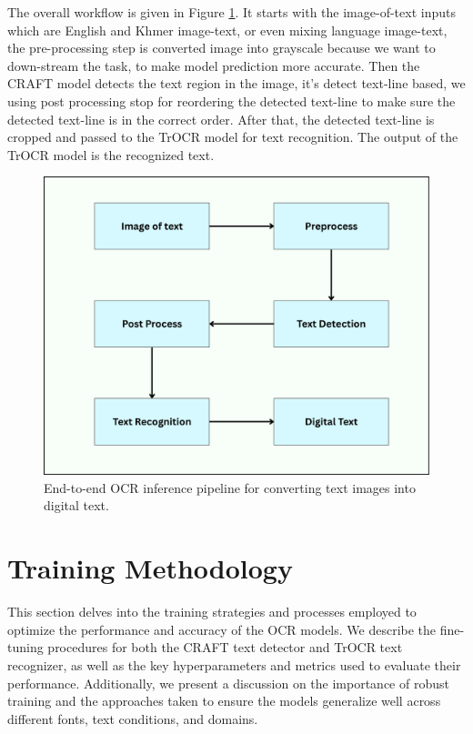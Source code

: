 The overall workflow is given in Figure \ref{fig:trocr-inference-full-pipeline}.
It starts with the image-of-text inputs which are English and
Khmer image-text, or even mixing language image-text, the pre-processing
step is converted image into grayscale because we want to down-stream
the task, to make model prediction more accurate. Then the CRAFT model
detects the text region in the image, it's detect text-line based,
we using post processing stop for reordering the detected text-line
to make sure the detected text-line is in the correct order.
After that, the detected text-line is cropped and passed to the TrOCR
model for text recognition. The output of the TrOCR model is the
recognized text. 
\begin{figure}[H]
    \centering
    \includegraphics[width=\textwidth]{figures/khmerOCR_inference_full_pipeline.png}
    \caption{End-to-end OCR inference pipeline for converting text images into digital text.}
    \label{fig:trocr-inference-full-pipeline}
\end{figure}

\section{Training Methodology}
\label{sec:training}
This section delves into the training strategies and processes employed to optimize 
the performance and accuracy of the OCR models. We describe the fine-tuning procedures 
for both the CRAFT text detector and TrOCR text recognizer, as well as the key 
hyperparameters and metrics used to evaluate their performance. Additionally, we 
present a discussion on the importance of robust training and the approaches taken 
to ensure the models generalize well across different fonts, text conditions, and 
domains.



